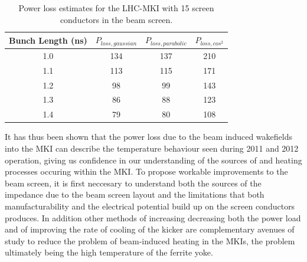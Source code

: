 \begin{table}
\label{tab:mki-15-heating}
\caption{Power loss estimates for the LHC-MKI with 15 screen conductors in the beam screen.}
\begin{center}
\begin{tabular}{c | c | c | c}
Bunch Length (ns) & $P_{loss, gaussian}$ & $P_{loss, parabolic}$ & $P_{loss, cos^{2}}$ \\ \hline
1.0 & 134 & 137 & 210 \\ \hline
1.1 & 113 & 115 & 171 \\ \hline
1.2 & 98 & 99 & 143 \\ \hline
1.3 & 86 & 88 & 123 \\ \hline
1.4 & 79 & 80 & 108 \\ \hline
\end{tabular}
\end{center}
\end{table}

It has thus been shown that the power loss due to the beam induced wakefields into the MKI can describe the temperature behaviour seen during 2011 and 2012 operation, giving us confidence in our understanding of the sources of and heating processes occuring within the MKI. To propose workable improvements to the beam screen, it is first neccesary to understand both the sources of the impedance due to the beam screen layout and the limitations that both manufacturability and the electrical potential build up on the screen conductors produces. In addition other methods of increasing decreasing both the power load and of improving the rate of cooling of the kicker are complementary avenues of study to reduce the problem of beam-induced heating in the MKIs, the problem ultimately being the high temperature of the ferrite yoke.

